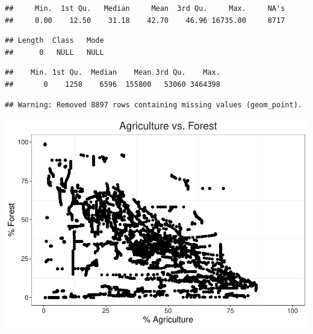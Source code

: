 \documentclass[12pt,]{article}
\newenvironment{Shaded}{\begin{snugshade}}{\end{snugshade}}
\newcommand{\KeywordTok}[1]{\textcolor[rgb]{0.13,0.29,0.53}{\textbf{#1}}}
\newcommand{\OperatorTok}[1]{\textcolor[rgb]{0.81,0.36,0.00}{\textbf{#1}}}
\newcommand{\NormalTok}[1]{#1}
\begin{document}
\begin{Shaded}
\end{Shaded}

\begin{verbatim}
##     Min.  1st Qu.   Median     Mean  3rd Qu.     Max.     NA's 
##     0.00    12.50    31.18    42.70    46.96 16735.00     8717
\end{verbatim}

\begin{Shaded}
\end{Shaded}

\begin{verbatim}
## Length  Class   Mode 
##      0   NULL   NULL
\end{verbatim}

\begin{Shaded}
\end{Shaded}

\begin{verbatim}
##    Min. 1st Qu.  Median    Mean 3rd Qu.    Max. 
##       0    1258    6596  155800   53060 3464398
\end{verbatim}

\begin{verbatim}
## Warning: Removed 8897 rows containing missing values (geom_point).
\end{verbatim}

\includegraphics{Marx_ENV872_Project_files/figure-latex/unnamed-chunk-3-1.pdf}
\end{document}
